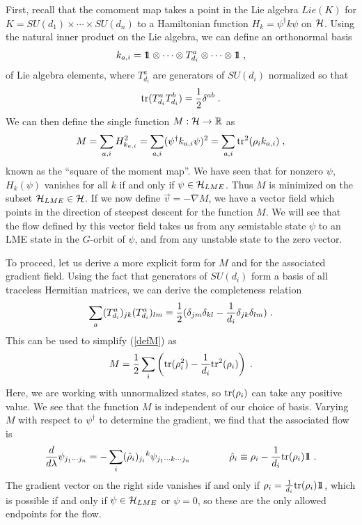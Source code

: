 \documentclass[12pt]{article}
\theoremstyle{definition}
\newcommand{\be}{\begin{equation}}
\newcommand{\ee}{\end{equation}}
\def\identity{{\rlap{1} \hskip 1.6pt \hbox{1}}}
\newcommand{\tr}{{\rm tr}}
\begin{document}
First, recall that the comoment map takes a point in the Lie algebra $Lie(K)$ for $K = SU(d_1) \times \cdots \times SU(d_n)$ to a Hamiltonian function $H_k = \psi^\dagger k \psi$ on ${\cal H}$. Using the natural inner product on the Lie algebra, we can define an orthonormal basis
\be
k_{a,i} = \identity  \otimes \cdots  \otimes T_{d_i}^a  \otimes \cdots  \otimes \identity \; ,
\ee
of Lie algebra elements, where $T^a_{d_i}$ are generators of $SU(d_i)$ normalized so that
\be
\tr(T^a_{d_i} T^b_{d_i}) = \frac{1}{2} \delta^{a b} \; .
\ee
We can then define the single function $M : {\cal H} \to \mathbb{R}$ as
\be
\label{defM}
M = \sum_{a,i} H^2_{k_{a,i}} = \sum_{a,i} (\psi^\dagger k_{a,i} \psi)^2 = \sum_{a,i} \tr^2(\rho_i k_{a,i})   \; ,
\ee
known as the ``square of the moment map''. We have seen that for nonzero $\psi$, $H_k(\psi)$ vanishes for all $k$ if and only if $\psi \in {\cal H}_{LME}$. Thus $M$ is minimized on the subset ${\cal H}_{LME} \in {\cal H}$. If we now define $\vec{v} = -\nabla M$, we have a vector field which points in the direction of steepest descent for the function $M$. We will see that the flow defined by this vector field takes us from any semistable state $\psi$ to an LME state in the $G$-orbit of $\psi$, and from any unstable state to the zero vector.

To proceed, let us derive a more explicit form for $M$ and for the associated gradient field. Using the fact that generators of $SU(d_i)$ form a basis of all traceless Hermitian matrices, we can derive the completeness relation
\be
\sum_a (T^a_{d_i})_{jk} (T^a_{d_i})_{lm} = {1 \over 2} (\delta_{jm} \delta_{kl} - {1 \over d_i} \delta_{jk} \delta_{lm}) \; .
\ee
This can be used to simplify (\ref{defM}) as
\be
M = \frac{1}{2} \sum_{i} \left(\tr(\rho_i^2) - {1 \over d_i} \tr^2(\rho_i)\right) \; .
\ee
Here, we are working with unnormalized states, so $\tr(\rho_i)$ can take any positive value. We see that the function $M$ is independent of our choice of basis. Varying $M$ with respect to $\psi^\dagger$ to determine the gradient, we find that the associated flow is
\be
\label{gradflow}
{d \over d \lambda} \psi_{j_1 \cdots j_n}  = - \sum_i  (\hat{\rho}_i)_{j_i} {}^{k} \psi_{j_1 \cdots k \cdots j_n} \qquad \qquad \hat{\rho}_i \equiv \rho_i - {1 \over d_i} \tr(\rho_i) \identity \; .
\ee
The gradient vector on the right side vanishes if and only if $\rho_i = {1 \over d_i} \tr(\rho_i) \identity$, which is possible if and only if $\psi \in {\cal H}_{LME}$ or $\psi = 0$, so these are the only allowed endpoints for the flow.
\end{document}
